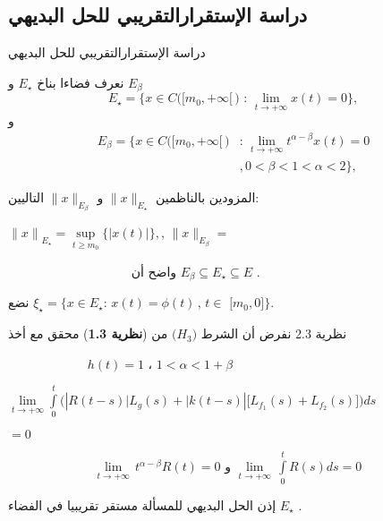 \documentclass[dvipsnames,mathserif]{beamer}
\begin{document}
\subsection{دراسة الإستقرارالتقريبي للحل البديهي}
\begin{frame}{دراسة الإستقرارالتقريبي للحل البديهي}
\begin{tcolorbox}[boxrule=2mm]
{\LARGE{}}
نعرف فضاءا بناخ 
$E_{\star}$
و
$E_{\beta}$
$$E_{\star} = \bigg\{ {x \in C\big( {\big[{m_0}, + \infty \big[}\, \big)\,\,:\,\mathop {\lim }\limits_{t \to  + \infty } x(t) = 0} \bigg\},$$
و
\begin{align*}
{E_\beta } = \bigg\{ x \in C\big( {\big[{m_0}, + \infty \big[} \, \big)&:\,\mathop {\lim }\limits_{t \to  + \infty } {t^{\alpha  - \beta }}x(t) = 0\\
&,0 < \beta  < 1 < \alpha  < 2 \bigg\},
\end{align*}
\end{tcolorbox}
\end{frame}
\begin{frame}
\begin{tcolorbox}[boxrule=2mm]
المزودين بالناظمين 
${\big\| x \big\|_{E_{\star}}}$
و
${\big\| x \big\|_{{E_\beta }}}$
التاليين:

${\big\| x \big\|}_{E_ {\star}}  = \mathop {\sup }\limits_{t \ge {m_0}} \big\{{\big| {x(t)} \big|} \big\},$,
${\big\| x \big\|_{{E_\beta }}} = \mathop {\sup\limits_{t \ge {m_0}} \big\{ {{t^{\alpha  - \beta }}\left| {x(t)} \right|} \big\}} $

~~~~~~~~~~~~~~~~~~~
واضح أن
${E_\beta } \subseteq {E_\star } \subseteq E$
.

نضع
${\xi _\star } = \bigg\{ {x \in {E_\star }:\,x(t) = \phi (t)\,,\,t \in \,\, \big[ {{m_0},0} \big]} \bigg\}.$
\end{tcolorbox}
\end{frame}
\begin{frame}
\begin{mybox}[colbacktitle = green]{نظرية 2.3  }
 {\LARGE{}}
نفرض أن الشرط 
$\big(H_3\big)$
من 
(\textbf{نظرية 1.3})
محقق مع أخذ

~~~~~~~~~~~~
$h(t)=1$
،
$1 <\alpha < 1 + \beta $

$\mathop {\lim }\limits_{t \to  + \infty }{\displaystyle \int\limits_0^t} {\bigg( {\left| {R(t - s)} \big|{L_g}(s) + \big| {k(t - s)} \right| \bigg[{L_{{f_1}}}(s) + {L_{{f_2}}}(s)\bigg]} \bigg)}ds $
\centerline{$= 0$}

~~~~~~~~~~~~~
$\mathop {\lim }\limits_{t \to  + \infty } \,{t^{\alpha  - \beta }}R(t) = 0$
و
$\mathop {\lim }\limits_{t \to  + \infty } \,{\displaystyle \int\limits_0^t}{R(s)} ds = 0$

إذن الحل البديهي للمسألة 
مستقر تقريبيا
 في الفضاء 
$E_\star$
.
\end{mybox}
\end{frame}
\end{document}
